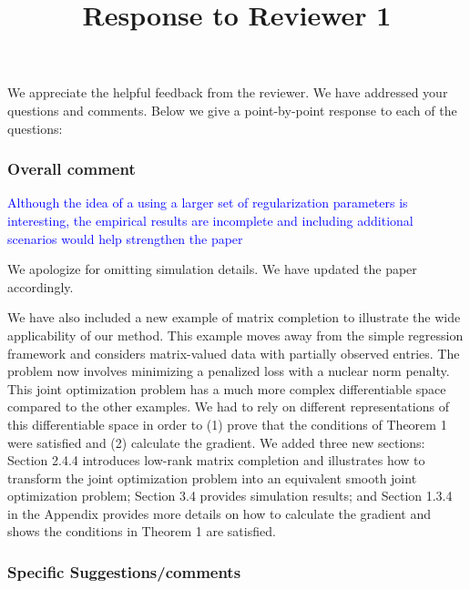 \documentclass[]{article}
\title{Response to Reviewer 1}
\newcommand{\overall}[1]{\textcolor{blue}{#1}}
\begin{document}
	
	\maketitle
	
	We appreciate the helpful feedback from the reviewer. We have addressed your questions and comments. Below we give a point-by-point response to each of the questions:
	
	\subsubsection*{Overall comment}
	\overall{Although the idea of a using a larger set of regularization parameters is interesting, the empirical results are incomplete and including additional scenarios would help strengthen the paper}
	
	We apologize for omitting simulation details. We have updated the paper accordingly.
	
	We have also included a new example of matrix completion to illustrate the wide applicability of our method. This example moves away from the simple regression framework and considers matrix-valued data with partially observed entries. The problem now involves minimizing a penalized loss with a nuclear norm penalty. This joint optimization problem has a much more complex differentiable space compared to the other examples. We had to rely on different representations of this differentiable space in order to (1) prove that the conditions of Theorem 1 were satisfied and (2) calculate the gradient. We added three new sections: Section 2.4.4 introduces low-rank matrix completion and illustrates how to transform the joint optimization problem into an equivalent smooth joint optimization problem; Section 3.4 provides simulation results; and Section 1.3.4 in the Appendix provides more details on how to calculate the gradient and shows the conditions in Theorem 1 are satisfied.
		
	\subsubsection*{Specific Suggestions/comments}
	
\end{document}
